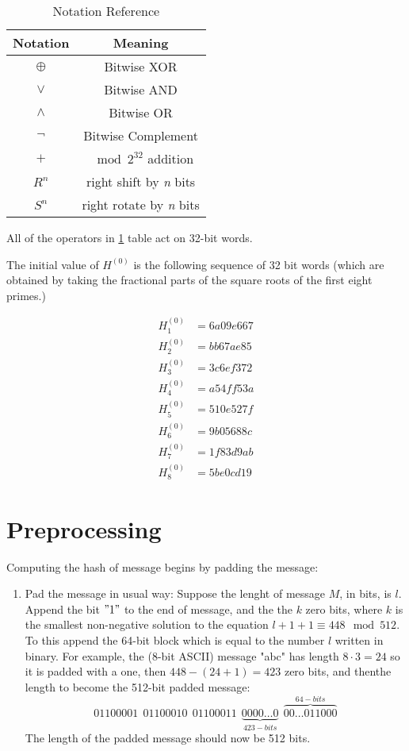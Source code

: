 \documentclass{report}
\begin{document}
\begin{center}
	\begin{table}[h!]
		\centering
		\begin{tabular}{|| c | c ||}
			\hline 
			\textbf{Notation} & \textbf{Meaning} \\ 
			\hline 
			$\oplus$ & Bitwise XOR \\
			\hline 
			$\vee$ & Bitwise AND \\ 
			\hline 
			$\wedge$ & Bitwise OR \\
			\hline 
			$\neg$ & Bitwise Complement\\ 
			\hline 
			$+$ & $\mod 2^{32}$ addition \\
			\hline 
			$R^{n}$ & right shift by \textit{n} bits\\
			\hline 
			$S^{n}$ & right rotate by \textit{n} bits\\
			\hline
		\end{tabular}
		\caption{Notation Reference}
		\label{notation-reference}
	\end{table}
\end{center}

All of the operators in \ref{notation-reference} table act on 32-bit words.

The initial value of $H^{(0)}$ is the following sequence of 32 bit words (which are obtained by taking the fractional parts of the square roots of the first eight primes.)

\begin{align}
	H_{1}^{(0)} &= 6a09e667 \\
	H_{2}^{(0)} &= bb67ae85 \\
	H_{3}^{(0)} &= 3c6ef372 \\
	H_{4}^{(0)} &= a54ff53a \\
	H_{5}^{(0)} &= 510e527f \\
	H_{6}^{(0)} &= 9b05688c \\
	H_{7}^{(0)} &= 1f83d9ab \\
	H_{8}^{(0)} &= 5be0cd19
\end{align}

\section{Preprocessing}
Computing the hash of message begins by padding the message: 
\begin{enumerate}
	\item{Pad the message in usual way:}
		Suppose the lenght of message $M$, in bits, is $l$. Append the bit $"1"$ to the end of message, and the the $k$ zero bits, where $k$ is the smallest non-negative solution to the equation $l + 1 + 1 \equiv 448 \mod 512$. To this append the 64-bit block which is equal to the number $l$ written in binary. For example, the (8-bit ASCII) message "abc" has length $8 \cdot 3 = 24$ so it is padded with a one, then $448 - (24 + 1) = 423$ zero bits, and thenthe length to become the 512-bit padded message: 
		\[ 01100001\ \ 01100010\ \ 01100011\ \ \underbrace{0000\ldots0}_{423-bits}\ \ \overbrace{00\ldots011000}^{64-bits} \]
		The length of the padded message should now be 512 bits.
\end{enumerate}

\appendix
\end{document}

